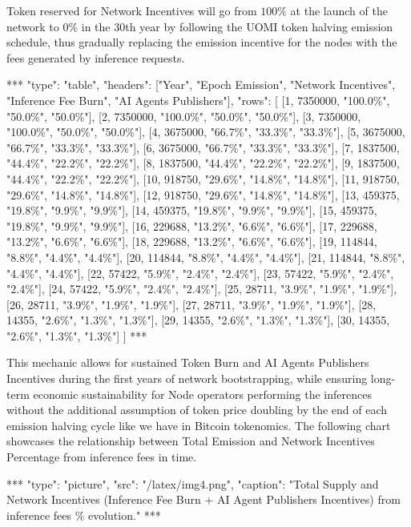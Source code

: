 \documentclass{article}
\begin{document}
Token reserved for Network Incentives will go from \( 100\%\) at the launch of the network to \( 0\%\) in the 30th year by following the UOMI token halving emission schedule, thus gradually replacing the emission incentive for the nodes with the fees generated by inference requests. 

\begin{center}
***
"type": "table",
"headers": ["Year", "Epoch Emission", "Network Incentives", "Inference Fee Burn", "AI Agents Publishers"],
"rows": [
  [1, 7350000, "100.0\%", "50.0\%", "50.0\%"],
  [2, 7350000, "100.0\%", "50.0\%", "50.0\%"],
  [3, 7350000, "100.0\%", "50.0\%", "50.0\%"],
  [4, 3675000, "66.7\%", "33.3\%", "33.3\%"],
  [5, 3675000, "66.7\%", "33.3\%", "33.3\%"],
  [6, 3675000, "66.7\%", "33.3\%", "33.3\%"],
  [7, 1837500, "44.4\%", "22.2\%", "22.2\%"],
  [8, 1837500, "44.4\%", "22.2\%", "22.2\%"],
  [9, 1837500, "44.4\%", "22.2\%", "22.2\%"],
  [10, 918750, "29.6\%", "14.8\%", "14.8\%"],
  [11, 918750, "29.6\%", "14.8\%", "14.8\%"],
  [12, 918750, "29.6\%", "14.8\%", "14.8\%"],
  [13, 459375, "19.8\%", "9.9\%", "9.9\%"],
  [14, 459375, "19.8\%", "9.9\%", "9.9\%"],
  [15, 459375, "19.8\%", "9.9\%", "9.9\%"],
  [16, 229688, "13.2\%", "6.6\%", "6.6\%"],
  [17, 229688, "13.2\%", "6.6\%", "6.6\%"],
  [18, 229688, "13.2\%", "6.6\%", "6.6\%"],
  [19, 114844, "8.8\%", "4.4\%", "4.4\%"],
  [20, 114844, "8.8\%", "4.4\%", "4.4\%"],
  [21, 114844, "8.8\%", "4.4\%", "4.4\%"],
  [22, 57422, "5.9\%", "2.4\%", "2.4\%"],
  [23, 57422, "5.9\%", "2.4\%", "2.4\%"],
  [24, 57422, "5.9\%", "2.4\%", "2.4\%"],
  [25, 28711, "3.9\%", "1.9\%", "1.9\%"],
  [26, 28711, "3.9\%", "1.9\%", "1.9\%"],
  [27, 28711, "3.9\%", "1.9\%", "1.9\%"],
  [28, 14355, "2.6\%", "1.3\%", "1.3\%"],
  [29, 14355, "2.6\%", "1.3\%", "1.3\%"],
  [30, 14355, "2.6\%", "1.3\%", "1.3\%"]
]
***
\end{center}

This mechanic allows for sustained Token Burn and AI Agents Publishers Incentives during the first years of network bootstrapping, while ensuring long-term economic sustainability for Node operators performing the inferences without the additional assumption of token price doubling by the end of each emission halving cycle like we have in Bitcoin tokenomics. The following chart showcases the relationship between Total Emission and Network Incentives Percentage from inference fees in time.

***
"type": "picture",
"src": "/latex/img4.png",
"caption": "Total Supply and Network Incentives (Inference Fee Burn + AI Agent Publishers Incentives) from inference fees \% evolution."
***
\end{document}
